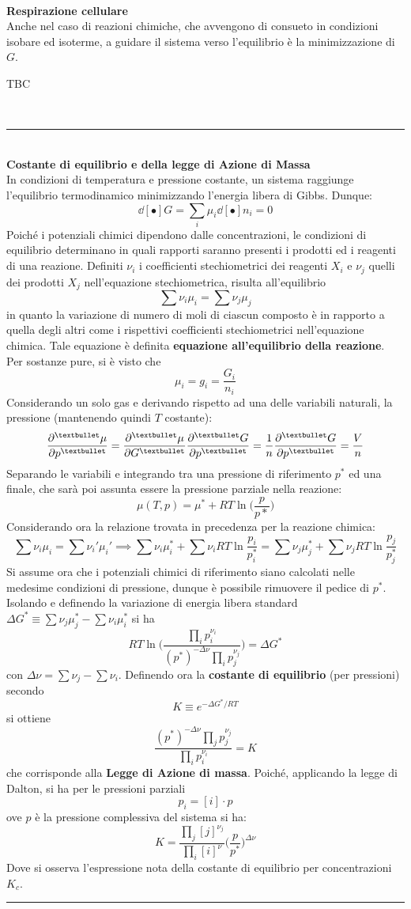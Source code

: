 \documentclass[10pt, oneside]{book}
\newcommand{\infobox}[2]{\vspace{0.5cm}~\\ \textbf{#1} \hrulefill \vspace{0.2cm}\\#2 {}\,\\\hrule \vspace{0.5cm}}
\newcommand{\ds}{\displaystyle}
\begin{document}
\infobox{Respirazione cellulare}{Anche nel caso di reazioni chimiche, che avvengono di consueto in condizioni isobare ed isoterme, a guidare il sistema verso l'equilibrio è la minimizzazione di $G$.

TBC

}

\infobox{Costante di equilibrio e della legge di Azione di Massa}{In condizioni di temperatura e pressione costante, un sistema raggiunge l'equilibrio termodinamico minimizzando l'energia libera di Gibbs. Dunque:
\[\dd[•]{G} = \sum_i \mu_i \dd[•]{n_i} = 0\]
Poiché i potenziali chimici dipendono dalle concentrazioni, le condizioni di equilibrio determinano in quali rapporti saranno presenti i prodotti ed i reagenti di una reazione. Definiti $\nu_i$ i coefficienti stechiometrici dei reagenti $X_i$ e $\nu_j$ quelli dei prodotti $X_j$ nell'equazione stechiometrica, risulta all'equilibrio
\[\sum \nu_i \mu_i = \sum \nu_j \mu_j\]
in quanto la variazione di numero di moli di ciascun composto è in rapporto a quella degli altri come i rispettivi coefficienti stechiometrici nell'equazione chimica. Tale equazione è definita \textbf{equazione all'equilibrio della reazione}.\\
Per sostanze pure, si è visto che
\[\mu_i = g_i = \frac{G_i}{n_i}\]
Considerando un solo gas e derivando rispetto ad una delle variabili naturali, la pressione (mantenendo quindi $T$ costante):
\[\pdv[•]{\mu}{p} = \pdv[•]{\mu}{G}\pdv[•]{G}{p} = \frac{1}{n} \pdv[•]{G}{p} = \frac{V}{n}\]
Separando le variabili e integrando tra una pressione di riferimento $p^\ast$ ed una finale, che sarà poi assunta essere la pressione parziale nella reazione:
\[\mu(T,p) = \mu^\ast + RT \ln \bigg( \frac{p}{p*} \bigg)\]
Considerando ora la relazione trovata in precedenza per la reazione chimica:
\[\sum \nu_i \mu_i = \sum \nu_i' \mu_i' \implies \sum \nu_i \mu_i^\ast + \sum \nu_i RT \ln \frac{p_i}{p_i^\ast} =   \sum \nu_j \mu_j^\ast + \sum \nu_j RT \ln \frac{p_j}{p_j^\ast} \]
Si assume ora che i potenziali chimici di riferimento siano calcolati nelle medesime condizioni di pressione, dunque è possibile rimuovere il pedice di $p^\ast$.\\
Isolando e definendo la variazione di energia libera standard $\ds \Delta G^\ast \equiv \sum \nu_j \mu_j^\ast - \sum \nu_i \mu_i^\ast$ si ha
\[RT \ln \bigg( \frac{\ds \prod_i p_i^{\nu_i}}{\ds (p^\ast)^{-\Delta \nu} \prod_i p_j^{\nu_j}} \bigg) = \Delta G^\ast\]
con $\ds \Delta \nu = \sum \nu_j - \sum \nu_i$. Definendo ora la \textbf{costante di equilibrio} (per pressioni) secondo
\[K \equiv e^{\ds - \Delta G^\ast \big/ RT}\]
si ottiene
\[\frac{(p^\ast)^{-\Delta \nu} \prod_j p_j^{\nu_j}}{\prod_i p_i^{\nu_i}} = K\]
che corrisponde alla \textbf{Legge di Azione di massa}. Poiché, applicando la legge di Dalton, si ha per le pressioni parziali
\[p_i = [i] \cdot p\]
ove $p$ è la pressione complessiva del sistema si ha:
\[K = \frac{\prod_j [j]^{\nu_j}}{\prod_i [i]^{\nu}} \bigg(\frac{p}{p^\ast}\bigg)^{\Delta \nu}\]
Dove si osserva l'espressione nota della costante di equilibrio per concentrazioni $K_c$.
}
\end{document}

